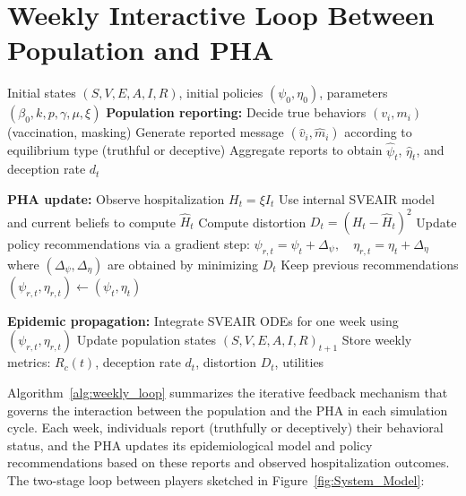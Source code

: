 \documentclass[sigconf,review]{acmart}
\begin{document}
\section{Weekly Interactive Loop Between Population and PHA}
\label{supp:weekly-loop}


\begin{table}[t]
\centering
\begin{minipage}{\textwidth}
\begin{algorithm}[H]
\caption{Weekly Interactive Loop Between Population and PHA}
\label{alg:weekly_loop}
\begin{algorithmic}[1]
\Require Initial states $(S,V,E,A,I,R)$, initial policies $(\psi_0,\eta_0)$, parameters $(\beta_0,k,p,\gamma,\mu,\xi)$
    \State \textbf{Population reporting:}
        \State Decide true behaviors $(v_i, m_i)$ (vaccination, masking)
        \State Generate reported message $(\hat{v}_i, \hat{m}_i)$ according to equilibrium type (truthful or deceptive)
    \EndFor
    \State Aggregate reports to obtain $\hat{\psi}_t$, $\hat{\eta}_t$, and deception rate $d_t$
    \Statex

    \State \textbf{PHA update:}
    \State Observe hospitalization $H_t = \xi I_t$
    \State Use internal SVEAIR model and current beliefs to compute $\hat{H}_t$
    \State Compute distortion $D_t = (H_t - \hat{H}_t)^2$
        \State Update policy recommendations via a gradient step:
        \Statex\hspace{1.2em}$\psi_{r,t} = \psi_t + \Delta_\psi,\quad \eta_{r,t} = \eta_t + \Delta_\eta$
        \State where $(\Delta_\psi,\Delta_\eta)$ are obtained by minimizing $D_t$
    \Else
        \State Keep previous recommendations $(\psi_{r,t}, \eta_{r,t}) \gets (\psi_t, \eta_t)$
    \EndIf
    \Statex

    \State \textbf{Epidemic propagation:}
    \State Integrate SVEAIR ODEs for one week using $(\psi_{r,t}, \eta_{r,t})$
    \State Update population states $(S,V,E,A,I,R)_{t+1}$
    \State Store weekly metrics: $R_c(t)$, deception rate $d_t$, distortion $D_t$, utilities
\EndFor
\end{algorithmic}
\end{algorithm}
\end{minipage}
\end{table}

Algorithm~\ref{alg:weekly_loop} summarizes the iterative feedback mechanism that governs the interaction between the population and the PHA in each simulation cycle. Each week, individuals report (truthfully or deceptively) their behavioral status, and the PHA updates its epidemiological model and policy recommendations based on these reports and observed hospitalization outcomes. The two-stage loop between players sketched in Figure~\ref{fig:System_Model}:
\end{document}
